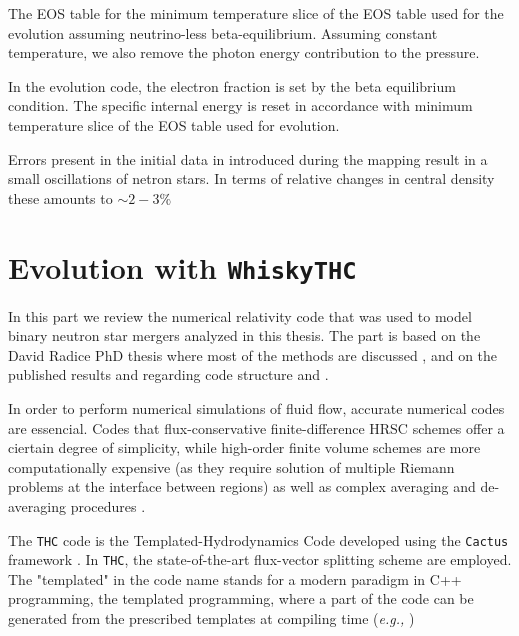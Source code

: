 \documentclass[11pt,a4paper,headinclude=true,DIV=14,BCOR=8mm,chapterprefix,listof=totoc,twoside,openright,abstracton]{scrbook}
\begin{document}
The EOS table for the minimum temperature slice of the EOS table used for the evolution assuming neutrino-less beta-equilibrium.
Assuming constant temperature, we also remove the photon energy contribution to the pressure.

In the evolution code, the electron fraction is set by the beta equilibrium condition. 
The specific internal energy is reset in accordance with minimum temperature slice of the EOS table used for evolution.

Errors present in the initial data in introduced during the mapping result in a small oscillations of netron stars.
In terms of relative changes in central density these amounts to $\sim2-3\%$ \cite{Radice:2018pdn}



\section{Evolution with \texttt{WhiskyTHC}}



In this part we review the numerical relativity code that was used to model binary neutron star mergers analyzed in this thesis.
The part is based on the David Radice PhD thesis where most of the methods are discussed \cite{Radice:2013apa}, and on the published results and regarding code structure and \cite{Radice:2012cu,Radice:2013xpa,Radice:2013hxh,Radice:2015nva}.

In order to perform numerical simulations of fluid flow, accurate numerical codes are essencial. Codes that flux-conservative finite-difference HRSC schemes offer a ciertain degree of simplicity, while high-order finite volume schemes are more computationally expensive (as they require solution of multiple Riemann problems at the interface between regions) \cite{Reisswig:2009us,Shu:2001rep} as well as complex averaging and de-averaging procedures \cite{Tchekhovskoy:2007zn}.

The \texttt{THC} code is the Templated-Hydrodynamics Code developed using the \texttt{Cactus} framework \cite{Goodale:2003}. In \texttt{THC}, the state-of-the-art flux-vector splitting scheme are employed. The "templated" in the code name stands for a modern paradigm in C++ programming, the templated programming, where a part of the code can be generated from the prescribed templates at compiling time (\textit{e.g.,} \cite{Yang:2001})
\end{document}
